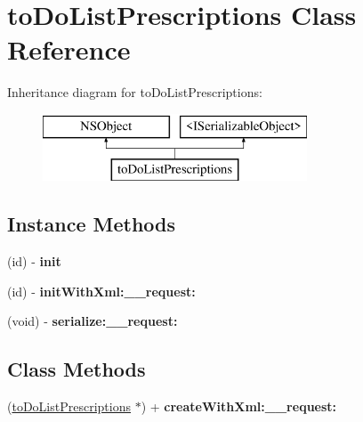 \hypertarget{interfaceto_do_list_prescriptions}{}\section{to\+Do\+List\+Prescriptions Class Reference}
\label{interfaceto_do_list_prescriptions}
Inheritance diagram for to\+Do\+List\+Prescriptions\+:\begin{figure}[H]
\begin{center}
\leavevmode
\includegraphics[height=2.000000cm]{interfaceto_do_list_prescriptions}
\end{center}
\end{figure}
\subsection*{Instance Methods}
\begin{DoxyCompactItemize}
\item 
\hypertarget{interfaceto_do_list_prescriptions_a42f4e513c008c4de5b818112c8104c2f}{}(id) -\/ {\bfseries init}\label{interfaceto_do_list_prescriptions_a42f4e513c008c4de5b818112c8104c2f}

\item 
\hypertarget{interfaceto_do_list_prescriptions_a9d899ad94fe706682077ce01553abc8e}{}(id) -\/ {\bfseries init\+With\+Xml\+:\+\_\+\+\_\+request\+:}\label{interfaceto_do_list_prescriptions_a9d899ad94fe706682077ce01553abc8e}

\item 
\hypertarget{interfaceto_do_list_prescriptions_a3cbad3499667a5468b2207788cd64293}{}(void) -\/ {\bfseries serialize\+:\+\_\+\+\_\+request\+:}\label{interfaceto_do_list_prescriptions_a3cbad3499667a5468b2207788cd64293}

\end{DoxyCompactItemize}
\subsection*{Class Methods}
\begin{DoxyCompactItemize}
\item 
\hypertarget{interfaceto_do_list_prescriptions_abdbf41cfd217a1e6e4d3900dade3a653}{}(\hyperlink{interfaceto_do_list_prescriptions}{to\+Do\+List\+Prescriptions} $\ast$) + {\bfseries create\+With\+Xml\+:\+\_\+\+\_\+request\+:}\label{interfaceto_do_list_prescriptions_abdbf41cfd217a1e6e4d3900dade3a653}

\end{DoxyCompactItemize}

